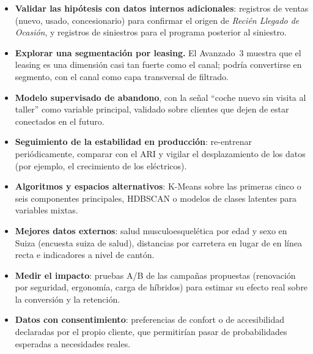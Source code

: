 \documentclass[11pt,a4paper]{article}
\newcommand{\seg}[1]{\textit{#1}}
\begin{document}
\begin{itemize}
  \item \textbf{Validar las hipótesis con datos internos adicionales}: registros de ventas (nuevo, usado, concesionario)
        para confirmar el origen de \seg{Recién Llegado de Ocasión}, y registros de siniestros para el programa posterior
        al siniestro.
  \item \textbf{Explorar una segmentación por leasing.} El Avanzado~3 muestra que el leasing es una dimensión casi tan
        fuerte como el canal; podría convertirse en segmento, con el canal como capa transversal de filtrado.
  \item \textbf{Modelo supervisado de abandono}, con la señal \enquote{coche nuevo sin visita al taller} como variable
        principal, validado sobre clientes que dejen de estar conectados en el futuro.
  \item \textbf{Seguimiento de la estabilidad en producción}: re-entrenar periódicamente, comparar con el ARI y vigilar
        el desplazamiento de los datos (por ejemplo, el crecimiento de los eléctricos).
  \item \textbf{Algoritmos y espacios alternativos}: K-Means sobre las primeras cinco o seis componentes principales,
        HDBSCAN o modelos de clases latentes para variables mixtas.
  \item \textbf{Mejores datos externos}: salud musculoesquelética por edad y sexo en Suiza (encuesta suiza de salud),
        distancias por carretera en lugar de en línea recta e indicadores a nivel de cantón.
  \item \textbf{Medir el impacto}: pruebas A/B de las campañas propuestas (renovación por seguridad, ergonomía, carga de
        híbridos) para estimar su efecto real sobre la conversión y la retención.
  \item \textbf{Datos con consentimiento}: preferencias de confort o de accesibilidad declaradas por el propio cliente,
        que permitirían pasar de probabilidades esperadas a necesidades reales.
\end{itemize}

\printbibliography[heading=bibintoc,title={Bibliografía}]
\end{document}
